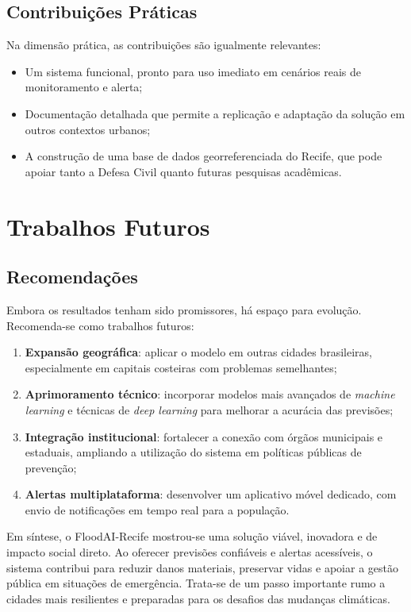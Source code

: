 \subsection{Contribuições Práticas}

Na dimensão prática, as contribuições são igualmente relevantes:
\begin{itemize}
    \item Um sistema funcional, pronto para uso imediato em cenários reais de monitoramento e alerta;
    \item Documentação detalhada que permite a replicação e adaptação da solução em outros contextos urbanos;
    \item A construção de uma base de dados georreferenciada do Recife, que pode apoiar tanto a Defesa Civil quanto futuras pesquisas acadêmicas.
\end{itemize}

\section{Trabalhos Futuros}

\subsection{Recomendações}

Embora os resultados tenham sido promissores, há espaço para evolução. Recomenda-se como trabalhos futuros:

\begin{enumerate}
    \item \textbf{Expansão geográfica}: aplicar o modelo em outras cidades brasileiras, especialmente em capitais costeiras com problemas semelhantes;
    \item \textbf{Aprimoramento técnico}: incorporar modelos mais avançados de \textit{machine learning} e técnicas de \textit{deep learning} para melhorar a acurácia das previsões;
    \item \textbf{Integração institucional}: fortalecer a conexão com órgãos municipais e estaduais, ampliando a utilização do sistema em políticas públicas de prevenção;
    \item \textbf{Alertas multiplataforma}: desenvolver um aplicativo móvel dedicado, com envio de notificações em tempo real para a população.
\end{enumerate}

\bigskip

Em síntese, o FloodAI-Recife mostrou-se uma solução viável, inovadora e de impacto social direto. Ao oferecer previsões confiáveis e alertas acessíveis, o sistema contribui para reduzir danos materiais, preservar vidas e apoiar a gestão pública em situações de emergência. Trata-se de um passo importante rumo a cidades mais resilientes e preparadas para os desafios das mudanças climáticas.
